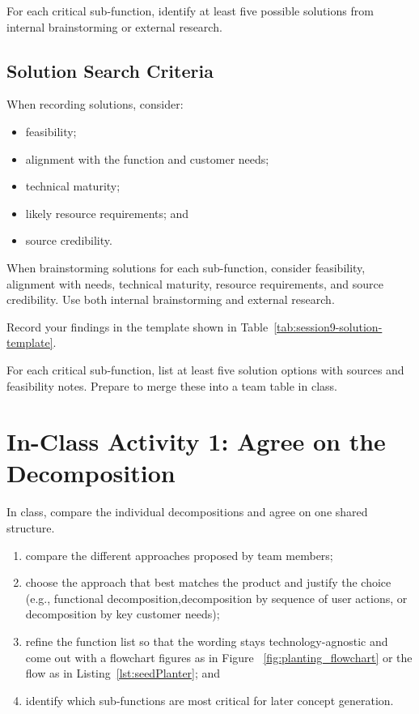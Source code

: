 For each critical sub-function, identify at least five possible solutions from internal brainstorming or external research.

\subsection{Solution Search Criteria}

When recording solutions, consider:
\begin{itemize}
    \item feasibility;
    \item alignment with the function and customer needs;
    \item technical maturity;
    \item likely resource requirements; and
    \item source credibility.
\end{itemize}

\begin{tcolorbox}[title=Hint]
When brainstorming solutions for each sub-function, consider feasibility, alignment with needs, technical maturity, resource requirements, and source credibility. Use both internal brainstorming and external research.
\end{tcolorbox}

Record your findings in the template shown in Table~\ref{tab:session9-solution-template}.


\begin{tcolorbox}[title=Checkpoint]
For each critical sub-function, list at least five solution options with sources and feasibility notes. Prepare to merge these into a team table in class.
\end{tcolorbox}

\section{In-Class Activity 1: Agree on the Decomposition}

In class, compare the individual decompositions and agree on one shared structure.

\begin{enumerate}
    \item compare the different approaches proposed by team members;
    \item choose the approach that best matches the product and justify the choice (e.g., functional decomposition,decomposition by sequence of user actions, or decomposition by key customer needs);
    \item refine the function list so that the wording stays technology-agnostic and come out with a flowchart figures as in Figure~ \ref{fig:planting_flowchart} or the flow as in Listing~\ref{lst:seedPlanter}; and
    \item identify which sub-functions are most critical for later concept generation.
\end{enumerate}

